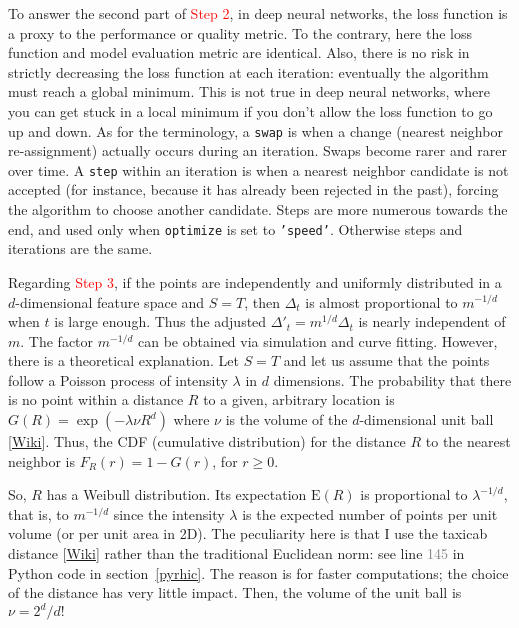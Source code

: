 \documentclass[oneside,10pt]{book}
\begin{document}
\noindent To answer the second part of \textcolor{red}{Step 2}, in deep neural networks, the loss function is a proxy to the performance or quality metric.
To the contrary, here the loss function and model evaluation metric are identical. Also, there is no risk in strictly decreasing the loss function at each iteration: eventually the algorithm must reach a global minimum. This is not true in deep neural networks, where you can get stuck in a local minimum if you don't allow the loss function to go up and down.   As for the terminology, a \texttt{swap} is when a change (nearest neighbor re-assignment) actually occurs during an iteration. Swaps become rarer and rarer over time. A \texttt{step} within an iteration is when a nearest neighbor candidate is not accepted (for instance, because it has already been rejected in the past), forcing the
 algorithm to choose another candidate. Steps are more numerous towards the end, and used only when \texttt{optimize} is set to \texttt{'speed'}. Otherwise steps
 and iterations are the same. 

Regarding \textcolor{red}{Step 3}, if the points are independently and uniformly distributed in a $d$-dimensional feature space and $S = T$, then $\Delta_t$ is
 almost proportional to $m^{-1/d}$ when $t$ is large enough. Thus the adjusted $\Delta'_t = m^{1/d}\Delta_t$ is nearly independent of $m$. The
 factor $m^{-1/d}$ can be obtained via simulation and curve fitting. However, there is a theoretical explanation.  Let $S = T$ and let us assume that the points follow 
 a \textcolor{index}{Poisson process} of intensity $\lambda$ in $d$ dimensions. The probability that there is no point within a distance $R$ to
 a given, arbitrary location is $G(R) =\exp(-\lambda \nu R^d)$ where $\nu$ is the volume of the $d$-dimensional \textcolor{index}{unit ball} 
[\href{https://en.wikipedia.org/wiki/Volume_of_an_n-ball}{Wiki}].  Thus, the CDF (cumulative distribution) for the distance $R$ to the
 nearest neighbor is $F_R(r) = 1 - G(r)$, for $r\geq 0$. 

So, $R$ has a \textcolor{index}{Weibull distribution}. Its expectation $\text{E}(R)$ is proportional to
 $\lambda^{-1/d}$, that is, to $m^{-1/d}$ since the intensity $\lambda$ is the expected number of points per unit volume (or per unit area in 2D).
The peculiarity here is that I use the 
\textcolor{index}{taxicab distance} [\href{https://en.wikipedia.org/wiki/Taxicab_geometry}{Wiki}] 
rather than the traditional Euclidean norm: see line \textcolor{gray}{145} in Python code in section~\ref{pyrhic}. The reason is for faster computations; the choice of the distance has very little impact. Then, the volume of the unit ball is $\nu=2^d / d!$
\end{document}
